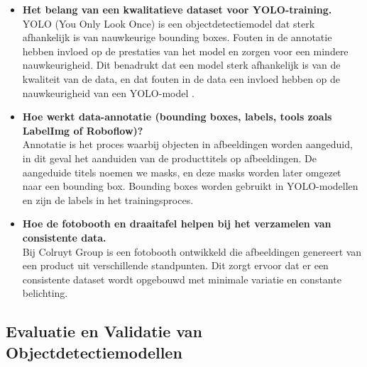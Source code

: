 \begin{itemize}
    \item \textbf{Het belang van een kwalitatieve dataset voor YOLO-training.} \\
    YOLO (You Only Look Once) is een objectdetectiemodel dat sterk afhankelijk is van nauwkeurige bounding boxes. Fouten in de annotatie hebben invloed op de prestaties van het model en zorgen voor een mindere nauwkeurigheid. Dit benadrukt dat een model sterk afhankelijk is van de kwaliteit van de data, en dat fouten in de data een invloed hebben op de nauwkeurigheid van een YOLO-model \autocite{Bertossi2020}.

    \item \textbf{Hoe werkt data-annotatie (bounding boxes, labels, tools zoals LabelImg of Roboflow)?} \\
    Annotatie is het proces waarbij objecten in afbeeldingen worden aangeduid, in dit geval het aanduiden van de producttitels op afbeeldingen. De aangeduide titels noemen we masks, en deze masks worden later omgezet naar een bounding box. Bounding boxes worden gebruikt in YOLO-modellen en zijn de labels in het trainingsproces. 

    \item \textbf{Hoe de fotobooth en draaitafel helpen bij het verzamelen van consistente data.} \\
    Bij Colruyt Group is een fotobooth ontwikkeld die afbeeldingen genereert van een product uit verschillende standpunten. Dit zorgt ervoor dat er een consistente dataset wordt opgebouwd met minimale variatie en constante belichting. 
\end{itemize}


\subsection{Evaluatie en Validatie van Objectdetectiemodellen}

